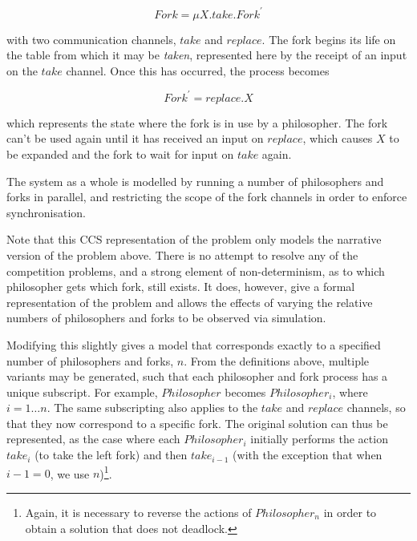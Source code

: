 \begin{equation}
Fork = \mu X.take.Fork^\prime
\end{equation}

\noindent with two communication channels, $take$ and
$replace$.  The fork begins its life on the table from which it
may be \emph{taken}, represented here by the receipt of an input on
the $take$ channel.  Once this has occurred, the process becomes

\begin{equation}
Fork^\prime = replace.X
\end{equation}

\noindent which represents the state where the fork is in use by a
philosopher.  The fork can't be used again until it has received an
input on $replace$, which causes $X$ to be expanded and the fork to
wait for input on $take$ again.

  The system as a whole is modelled by running a number of
  philosophers and forks in parallel, and restricting the scope of the
  fork channels in order to enforce synchronisation.


Note that this CCS representation of the problem only models the
narrative version of the problem above.  There is no attempt to
resolve any of the competition problems, and a strong element of
non-determinism, as to which philosopher gets which fork, still
exists.  It does, however, give a formal representation of the problem
and allows the effects of varying the relative numbers of philosophers
and forks to be observed via simulation.

Modifying this slightly gives a model that corresponds
exactly to a specified number of philosophers and forks, $n$.  From
the definitions above, multiple variants may be generated, such that
each philosopher and fork process has a unique subscript.  For
example, $Philosopher$ becomes $Philosopher_i$, where $i = 1\dots n$.
The same subscripting also applies to the $take$ and $replace$
channels, so that they now correspond to a specific fork.  The
original solution can thus be represented, as the case where each
$Philosopher_i$ initially performs the action $take_i$ (to take
the left fork) and then $take_{i-1}$ (with the exception that when
$i-1 = 0$, we use $n$)\footnote{Again, it is necessary to reverse the
  actions of $Philosopher_n$ in order to obtain a solution that does not
  deadlock.}.


